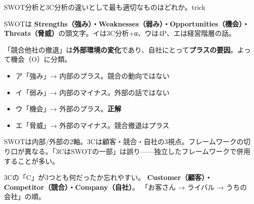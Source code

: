 \begin{mondai}{SWOT分析と3C分析の違いとして最も適切なものはどれか。}{trick}
\end{mondai}

\kaitoupage

\begin{kaisetsu}
SWOTは \textbf{Strengths（強み）・Weaknesses（弱み）・Opportunities（機会）・Threats（脅威）}の頭文字。イは3C分析+α、ウは4P、エは経営階層の話。
\end{kaisetsu}

\begin{kaisetsu}
「競合他社の撤退」は\textbf{外部環境の変化}であり、自社にとって\textbf{プラスの要因}。よって機会（O）に分類。
\end{kaisetsu}
\begin{goutoubun}
\begin{itemize}
  \item ア「強み」→ 内部のプラス。競合の動向ではない
  \item イ「弱み」→ 内部のマイナス。外部の話ではない
  \item ウ「機会」→ 外部のプラス。\textbf{正解}
  \item エ「脅威」→ 外部のマイナス。競合撤退はプラス
\end{itemize}
\end{goutoubun}

\begin{kaisetsu}
SWOTは内部/外部の2軸。3Cは顧客・競合・自社の3視点。フレームワークの切り口が異なる。「3CはSWOTの一部」は誤り——独立したフレームワークで併用することが多い。
\end{kaisetsu}


\mondaipage
{}

\begin{stumble}
3Cの「C」が3つとも何だったか忘れやすい。
\textbf{Customer（顧客）・Competitor（競合）・Company（自社）}。
「お客さん → ライバル → うちの会社」の順。
\end{stumble}

